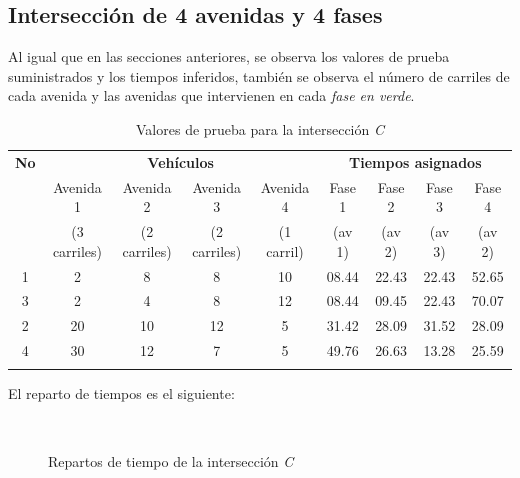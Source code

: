 \newpage
\subsection{Intersección de 4 avenidas y 4 fases}
Al igual que en las secciones anteriores, se observa los valores de prueba suministrados y los tiempos inferidos, también se observa el número de carriles de cada avenida y las avenidas que intervienen en cada \emph{fase en verde}.

\begin{longtable}[c]{ccccccccc} \toprule
	\textbf{No} & \multicolumn{4}{c}{\textbf{Vehículos}} & \multicolumn{4}{c}{\textbf{Tiempos asignados}} \\[0.2cm]
	
	&  Avenida 1 & Avenida 2 &  Avenida 3 & Avenida 4 & Fase 1 & Fase 2 & Fase 3 & Fase 4\\[0cm]
	
	&{\scriptsize(3 carriles)}&{\scriptsize (2 carriles)}
	&{\scriptsize(2 carriles)}&{\scriptsize (1 carril)}
	&{\scriptsize (av 1)} &{\scriptsize(av 2)}
	&{\scriptsize (av 3)} &{\scriptsize(av 2)} \\[0.1cm]\midrule
	
	1 & 2 	& 8		& 8 	& 10 	& 08.44 & 22.43 & 22.43 & 52.65 \\
	3 & 2 	& 4 	& 8 	& 12 	& 08.44 & 09.45 & 22.43 & 70.07 \\
	2 & 20 	& 10 	& 12 	& 5 	& 31.42 & 28.09 & 31.52 & 28.09\\
	4 & 30 	& 12	& 7 	& 5 	& 49.76 & 26.63 & 13.28 & 25.59 \\\bottomrule
	\caption{Valores de prueba para la intersección \textit{C}}
\end{longtable}
\vspace{5\parskip}
El reparto de tiempos es el siguiente:
\begin{figure}[H]
	\centering
	\\
	\caption{Repartos de tiempo de la intersección \textit{C}}
\end{figure}
